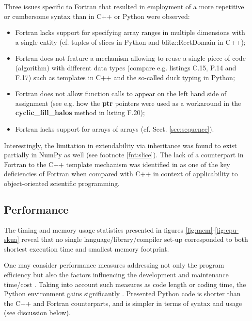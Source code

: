 \documentclass[twocolumn]{article}
\newcommand{\prog}[1]{{\rm\bf#1}}
\begin{document}
  Three issues specific to Fortran that 
    resulted in employment of a more repetitive or cumbersome syntax than in C++ or Python
    were observed:
  \begin{itemize}
    \item{Fortran lacks support for specifying array ranges in multiple dimensions
      with a single entity (cf. tuples of slices in Python and blitz::RectDomain in C++);
    }
    \item{Fortran does not feature a mechanism allowing to reuse a single piece of code (algorithm)
      with different data types (compare e.g. listings C.15, P.14 and F.17) such as
      templates in C++ and the so-called duck typing in Python;}
    \item{Fortran does not allow function calls to appear on the left hand side
      of assignment (see e.g. how the \prog{ptr} pointers were used as a workaround in the \prog{cyclic\_fill\_halos}
      method in listing F.20);}
    \item{Fortran lacks support for arrays of arrays (cf. Sect. \ref{sec:sequence}).}
  \end{itemize}
  Interestingly, the limitation in extendability via inheritance was found to
    exist partially in NumPy as well (see footnote \ref{fnt:slice}).
  The lack of a counterpart in Fortran to the C++ template mechanism was identified in
    \citep{Cary_et_al_1997}
    as one of the key deficiencies of Fortran when compared with C++ in context 
    of applicability to object-oriented scientific programming.

  \subsection{Performance}
  
  The timing and memory usage statistics presented in figures \ref{fig:mem}-\ref{fig:cpu-skua}
    reveal that no single language/library/compiler set-up 
    corresponded to both shortest execution time and smallest memory footprint.

  One may consider performance measures addressing not only the program efficiency but also 
    the factors influencing the development and maintenance time/cost 
    \citep[of particular importance in scientific computing,][]{Wilson_2006}.
  Taking into account such measures as code length or coding time,
    the Python environment gains significantly \citep[see also discussion in][]{Lin_2012}.
  Presented Python code is shorter than the C++ and Fortran counterparts,
    and is simpler in terms of syntax and usage (see discussion below).
\end{document}
